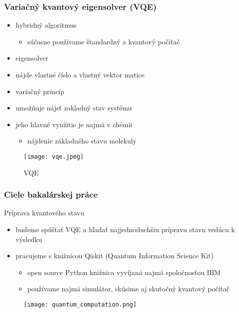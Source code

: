 \documentclass{beamer}
\begin{document}
\begin{frame}
	\frametitle{Variačný kvantový eigensolver (VQE)}
	\begin{itemize}
		\item hybridný algoritmus
		      \begin {itemize}
		\item súčasne používame štandardný a kvantový počítač
	\end{itemize}
	\item eigensolver
	\item 	\begin{itemize}
	nájde vlastné číslo a vlastný vektor matice
	\end{itemize}
	\item variačný princíp
	\item \begin{itemize}
	umožňuje nájsť zakladný stav systému
	\end{itemize}
	\item jeho hlavné využitie je najmä v chémii
	\begin{itemize} 
		\item nájdenie základného stavu molekuly
	\end{itemize}
	\end{itemize}
			
	\begin{figure}
		\centering
		\texttt{[image: vqe.jpeg]}
		\caption{VQE}
						            
	\end{figure}
\end{frame}


\begin{frame}
	\frametitle{Ciele bakalárskej práce}
	Príprava kvantového stavu
	\begin{itemize}
		\item budeme spúšťať VQE a hľadať najjednoduchšiu prípravu stavu vedúcu k výsledku
		\item pracujeme s knižnicou Qiskit (Quantum Information Science Kit)
		      \begin{itemize}
		      	\item open source Python knižnica vyvíjaná najmä spoločnosťou IBM
		      	\item používame najmä simulátor, skúsime aj skutočný kvantový počítač
		      \end{itemize}
	\end{itemize}
	\begin{figure}
		\centering
		\texttt{[image: quantum\_computation.png]}
	\end{figure}
\end{frame}
\end{document}
